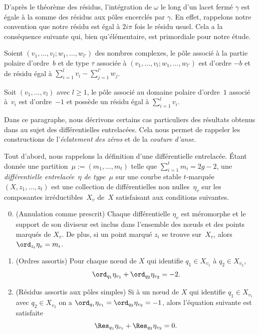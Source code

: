 \par
D'après le théorème des résidus, l'intégration de $\omega$ le long d'un lacet fermé $\gamma$ est égale à la somme des résidus aux pôles encerclés par $\gamma$. En effet, rappelons notre convention que notre résidu est égal à $2i\pi$ fois le résidu usuel.
Cela a la conséquence suivante qui, bien qu'élémentaire, est primordiale pour notre étude.
\begin{lem}\label{lm:residu}
Soient $(v_{1},\dots,v_{l};w_{1},\dots,w_{l'})$ des nombres complexes, le pôle associé à la partie polaire d'ordre~$b$ et de type $\tau$ associée à $(v_{1},\dots,v_{l};w_{1},\dots,w_{l'})$ est d'ordre $-b$ et de résidu égal à $\sum_{i=1}^{l} v_{i}-\sum_{j=1}^{l'} w_{j}$.

Soit $(v_{1},\dots,v_{l})$ avec $l\geq1$, le pôle associé au domaine polaire d'ordre~$1$ associé à~$v_{i}$ est d'ordre~$-1$ et possède un résidu égal à $\sum_{i=1}^{l} v_{i}$.
\end{lem}

\label{sec:pluridiffentre}

Dans ce paragraphe, nous décrivons certains cas particuliers des résultats obtenus dans \cite{BCGGM} au sujet des différentielles entrelacées. Cela nous permet de rappeler les constructions de l'\emph{éclatement des zéros} et de la \emph{couture d'anse}.

Tout d'abord, nous rappelons la définition d'une différentielle entrelacée.
Étant donnée une partition~$\mu:=(m_{1},\dots,m_{t})$ telle que $\sum_{i=1}^t m_i = 2g-2$, une \emph{différentielle entrelacée~$\eta$ de type~$\mu$}
sur une courbe stable $t$-marquée $(X,z_1,\ldots,z_t)$
est une collection de
différentielles non nulles~$\eta_v$ sur les composantes irréductibles~$X_v$ de~$X$ satisfaisant aux conditions suivantes.
\begin{enumerate}\setcounter{enumi}{-1}
\item
(Annulation comme prescrit) Chaque différentielle $\eta_v$ est méromorphe et le support de son diviseur est inclus dans l'ensemble des nœuds et des points marqués de $X_v$. De plus, si un point marqué $z_i$ se trouve sur~$X_v$, alors $\ord_{z_i} \eta_v=m_i$.
\item
(Ordres assortis) Pour chaque nœud de $X$ qui identifie $q_1 \in X_{v_1}$ à $q_2 \in X_{v_2}$,\vspace*{-3pt}
\[
\ord_{q_1} \eta_{v_1}+\ord_{q_2} \eta_{v_2} = -2. \]
\item
(Résidus assortis aux pôles simples) Si à un nœud de $X$
qui identifie $q_1 \in X_{v_1}$ avec $q_2 \in X_{v_2}$ on a $\ord_{q_1}\eta_{v_1}=
\ord_{q_2} \eta_{v_2}=-1$, alors l'équation suivante est satisfaite\vspace*{-3pt}
\[
\Res_{q_1}\eta_{v_1} + \Res_{q_2}\eta_{v_2} = 0 .
\]
\end{enumerate}

